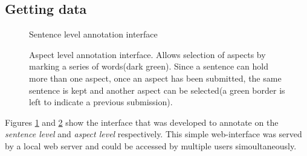 \documentclass[a4paper,11pt]{kth-mag}
\begin{document}
\newpage
\subsection{Getting data}
\begin{figure}[h]
  \centering
  \caption{Sentence level annotation interface}
  \label{fig:annotate_sentence}
\end{figure}

\begin{figure}[h]
  \centering
  \caption{Aspect level annotation interface. Allows selection of aspects by marking a series of words(dark green). Since a sentence can hold more than one aspect, once an aspect has been submitted, the same sentence is kept and another aspect can be selected(a green border is left to indicate a previous submission).}
  \label{fig:annotate_aspect}
\end{figure}

Figures \ref{fig:annotate_sentence} and \ref{fig:annotate_aspect} show the interface that was developed to annotate on the \emph{sentence level} and \emph{aspect level} respectively. This simple web-interface was served by a local web server and could be accessed by multiple users simoultaneously.
\end{document}

